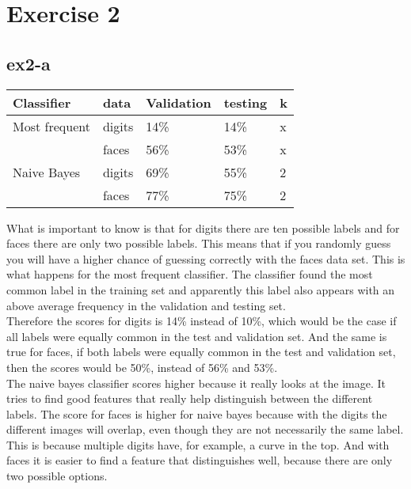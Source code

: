 \section{Exercise 2}
\subsection{ex2-a}
\begin{table}[!htbp]
\centering
\begin{tabular}{|l|l||l|l||l|}
\hline
Classifier    & data   & Validation & testing & k \\ \hline
Most frequent & digits & 14\%       & 14\%    & x \\ 
              & faces  & 56\%       & 53\%    & x \\ \hline
Naive Bayes   & digits & 69\%       & 55\%    & 2 \\ 
              & faces  & 77\%       & 75\%    & 2 \\ \hline

\end{tabular}
\end{table}

What is important to know is that for digits there are ten possible labels and for faces there
are only two possible labels. This means that if you randomly guess you will have a higher chance
of guessing correctly with the faces data set. This is what happens for the most frequent 
classifier. The classifier found the most common label in the training set and apparently 
this label also appears with an above average frequency in the validation and testing set.\\
Therefore the scores for digits is 14\% instead of 10\%, which would be the case if all labels
were equally common in the test and validation set. And the same is true for faces, if both 
labels were equally common in the test and validation set, then the scores would be 50\%, 
instead of 56\% and 53\%.\\
The naive bayes classifier scores higher because it really looks at the image. It tries to
find good features that really help distinguish between the different labels.
The score for faces is higher for naive bayes because with the digits the different images will
overlap, even though they are not necessarily the same label. This is because multiple digits 
have, for example, a curve in the top. And with faces it is easier to find a feature that
distinguishes well, because there are only two possible options.


